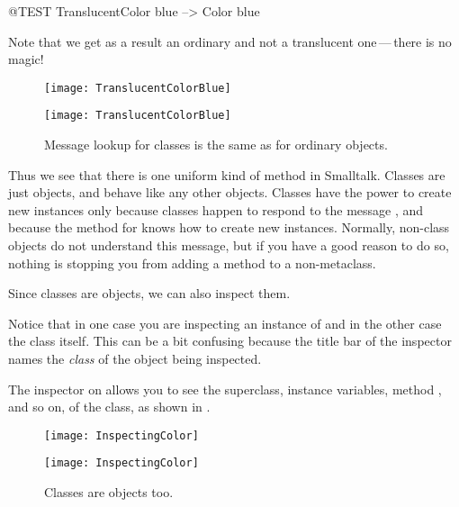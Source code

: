 \documentclass[a4paper,10pt,twoside]{book}
\begin{document}
\begin{code}{@TEST}
TranslucentColor blue --> Color blue
\end{code}
\noindent
Note that we get as a result an ordinary  and not a translucent one\,---\,there is no magic!

\begin{center}
\begin{figure}[!ht]
\ifluluelse
	{\centerline {\texttt{[image: TranslucentColorBlue]}}}
	{\centerline {\texttt{[image: TranslucentColorBlue]}}}
\caption{Message lookup for classes is the same as for ordinary objects.\label{fig:metaclasslookup}}
\end{figure}
\end{center}

Thus we see that there is one uniform kind of method  in Smalltalk.
Classes are just objects, and behave like any other objects. 
Classes have the power to create new instances only because classes happen to respond to the message , and because the method for  knows how to create new instances.
Normally, non-class objects do not understand this message, but if you have a good reason to do so, nothing is stopping you from adding a  method to a non-metaclass.

Since classes are objects, we can also inspect them.


\noindent
Notice that in one case you are inspecting an instance of  and in the other case the  class itself.  
This can be a bit confusing because the title bar of the inspector names the \emph{class} of the object being inspected.

The inspector on  allows you to see the superclass, instance variables, method , and so on, of the  class, as shown in .

\begin{center}
\begin{figure}[!ht]
\ifluluelse
	{\centerline{\texttt{[image: InspectingColor]}}}
	{\centerline{\texttt{[image: InspectingColor]}}}
\caption{Classes are objects too.\label{fig:inspectingColor}}
\end{figure}
\end{center}
\end{document}
